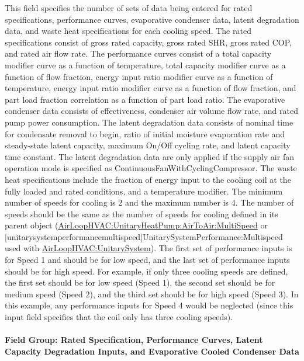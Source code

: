This field specifies the number of sets of data being entered for rated specifications, performance curves, evaporative condenser data, latent degradation data, and waste heat specifications for each cooling speed. The rated specifications consist of gross rated capacity, gross rated SHR, gross rated COP, and rated air flow rate. The performance curves consist of a total capacity modifier curve as a function of temperature, total capacity modifier curve as a function of flow fraction, energy input ratio modifier curve as a function of temperature, energy input ratio modifier curve as a function of flow fraction, and part load fraction correlation as a function of part load ratio. The evaporative condenser data consists of effectiveness, condenser air volume flow rate, and rated pump power consumption. The latent degradation data consists of nominal time for condensate removal to begin, ratio of initial moisture evaporation rate and steady-state latent capacity, maximum On/Off cycling rate, and latent capacity time constant. The latent degradation data are only applied if the supply air fan operation mode is specified as ContinuousFanWithCyclingCompressor. The waste heat specifications include the fraction of energy input to the cooling coil at the fully loaded and rated conditions, and a temperature modifier. The minimum number of speeds for cooling is 2 and the maximum number is 4. The number of speeds should be the same as the number of speeds for cooling defined in its parent object (\hyperref[airloophvacunitaryheatpumpairtoairmultispeed]{AirLoopHVAC:UnitaryHeatPump:AirToAir:MultiSpeed} or [unitarysystemperformancemultispeed]{UnitarySystemPerformance:Multispeed} used with \hyperref[airloophvacunitarysystem]{AirLoopHVAC:UnitarySystem}). The first set of performance inputs is for Speed 1 and should be for low speed, and the last set of performance inputs should be for high speed. For example, if only three cooling speeds are defined, the first set should be for low speed (Speed 1), the second set should be for medium speed (Speed 2), and the third set should be for high speed (Speed 3). In this example, any performance inputs for Speed 4 would be neglected (since this input field specifies that the coil only has three cooling speeds).

\paragraph{Field Group: Rated Specification, Performance Curves, Latent Capacity Degradation Inputs, and Evaporative Cooled Condenser Data}\label{field-group-rated-specification-performance-curves-latent-capacity-degradation-inputs-and-evaporative-cooled-condenser-data}


